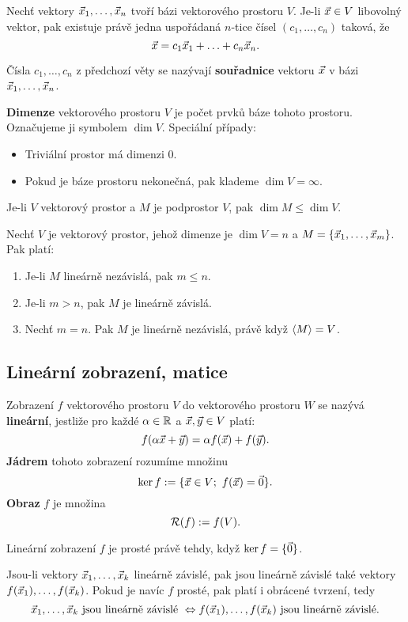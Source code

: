 \begin{veta}
Nechť vektory $\vec{x}_1,\ldots,\vec{x}_n$ tvoří bázi vektorového prostoru $V$.
Je-li $\vec{x}\in V$ libovolný vektor, pak existuje právě jedna uspořádaná $n$-tice čísel $(c_1,\ldots,c_n)$ taková, že
$$ \vec{x} = c_1\vec{x}_1+\ldots+c_n\vec{x}_n. $$
\end{veta}

\begin{df}
Čísla $c_1,\ldots,c_n$ z předchozí věty se nazývají {\bf souřadnice} vektoru $\vec{x}$ v bázi $\vec{x}_1,\ldots,\vec{x}_n$.
\end{df}

\begin{df}
{\bf Dimenze} vektorového prostoru $V$ je počet prvků báze tohoto prostoru.
Označujeme ji symbolem $\dim V$.
Speciální případy:
\begin{itemize}
\item Triviální prostor má dimenzi 0.
\item Pokud je báze prostoru nekonečná, pak klademe $\dim V=\infty$.
\end{itemize}
\end{df}
% 
Je-li $V$ vektorový prostor a $M$ je podprostor $V$, pak $\dim M \le\dim V$.

\begin{veta}
Nechť $V$ je vektorový prostor, jehož dimenze je $\dim V=n$ a $M=\{\vec{x}_1,\ldots,\vec{x}_m\}$.
Pak platí:
\begin{enumerate}
\item Je-li $M$ lineárně nezávislá, pak $m\le n$.
\item Je-li $m>n$, pak $M$ je lineárně závislá.
\item Nechť $m=n$. Pak $M$ je lineárně nezávislá, právě když $\langle M\rangle=V$.
\end{enumerate}
\end{veta}



\subsection{Lineární zobrazení, matice}

\begin{df}
Zobrazení $f$ vektorového prostoru $V$ do vektorového prostoru $W$ se nazývá {\bf lineární}, jestliže pro každé $\alpha\in\mathbb R$ a $\vec{x},\vec{y}\in V$ platí:
$$ f(\alpha\vec{x}+\vec{y})=\alpha f(\vec{x}) + f(\vec{y}). $$
{\bf Jádrem} tohoto zobrazení rozumíme množinu
$$ \ker f:=\{\vec{x}\in V;~f(\vec{x})=\vec{0}\}. $$
{\bf Obraz} $f$ je množina
$$ \mathcal R(f) :=f(V). $$
\end{df}
Lineární zobrazení $f$ je prosté právě tehdy, když $\ker f=\{\vec{0}\}$.
\begin{veta}
Jsou-li vektory $\vec{x}_1,\ldots,\vec{x}_k$ lineárně závislé, pak jsou lineárně závislé také vektory $f(\vec{x}_1),\ldots,f(\vec{x}_k)$.
Pokud je navíc $f$ prosté, pak platí i obrácené tvrzení, tedy
$$ \vec{x}_1,\ldots,\vec{x}_k \mbox{ jsou lineárně závislé }\Leftrightarrow f(\vec{x}_1),\ldots,f(\vec{x}_k)\mbox{ jsou lineárně závislé}. $$
\end{veta}


